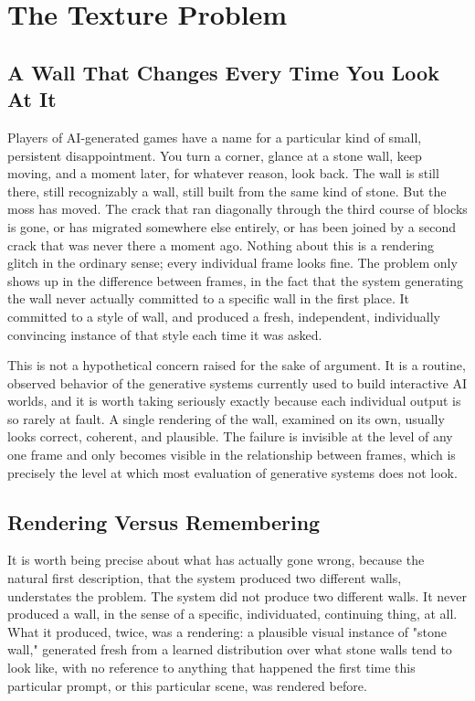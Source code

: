 \chapter{The Texture Problem}

\section{A Wall That Changes Every Time You Look At It}

Players of AI-generated games have a name for a particular kind of small, persistent disappointment. You turn a corner, glance at a stone wall, keep moving, and a moment later, for whatever reason, look back. The wall is still there, still recognizably a wall, still built from the same kind of stone. But the moss has moved. The crack that ran diagonally through the third course of blocks is gone, or has migrated somewhere else entirely, or has been joined by a second crack that was never there a moment ago. Nothing about this is a rendering glitch in the ordinary sense; every individual frame looks fine. The problem only shows up in the difference between frames, in the fact that the system generating the wall never actually committed to a specific wall in the first place. It committed to a style of wall, and produced a fresh, independent, individually convincing instance of that style each time it was asked.

This is not a hypothetical concern raised for the sake of argument. It is a routine, observed behavior of the generative systems currently used to build interactive AI worlds, and it is worth taking seriously exactly because each individual output is so rarely at fault. A single rendering of the wall, examined on its own, usually looks correct, coherent, and plausible. The failure is invisible at the level of any one frame and only becomes visible in the relationship between frames, which is precisely the level at which most evaluation of generative systems does not look.

\section{Rendering Versus Remembering}

It is worth being precise about what has actually gone wrong, because the natural first description, that the system produced two different walls, understates the problem. The system did not produce two different walls. It never produced a wall, in the sense of a specific, individuated, continuing thing, at all. What it produced, twice, was a rendering: a plausible visual instance of "stone wall," generated fresh from a learned distribution over what stone walls tend to look like, with no reference to anything that happened the first time this particular prompt, or this particular scene, was rendered before.

